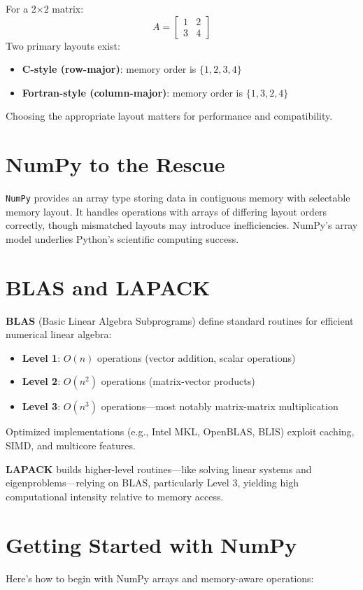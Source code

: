 \documentclass{book}
\begin{document}
For a 2×2 matrix:
\[
A = \begin{bmatrix}
1 & 2\\
3 & 4
\end{bmatrix}
\]
Two primary layouts exist:
\begin{itemize}
  \item \textbf{C-style (row-major)}: memory order is \(\{1,2,3,4\}\)
  \item \textbf{Fortran-style (column-major)}: memory order is \(\{1,3,2,4\}\)
\end{itemize}
Choosing the appropriate layout matters for performance and compatibility.

\section{NumPy to the Rescue}
\texttt{NumPy} provides an array type storing data in contiguous memory with selectable memory layout. It handles operations with arrays of differing layout orders correctly, though mismatched layouts may introduce inefficiencies. NumPy’s array model underlies Python's scientific computing success.

\section{BLAS and LAPACK}
\textbf{BLAS} (Basic Linear Algebra Subprograms) define standard routines for efficient numerical linear algebra:
\begin{itemize}
  \item \textbf{Level 1}: \(O(n)\) operations (vector addition, scalar operations)
  \item \textbf{Level 2}: \(O(n^2)\) operations (matrix-vector products)
  \item \textbf{Level 3}: \(O(n^3)\) operations—most notably matrix-matrix multiplication
\end{itemize}
Optimized implementations (e.g., Intel MKL, OpenBLAS, BLIS) exploit caching, SIMD, and multicore features.

\textbf{LAPACK} builds higher-level routines—like solving linear systems and eigenproblems—relying on BLAS, particularly Level 3, yielding high computational intensity relative to memory access.

\section{Getting Started with NumPy}
Here's how to begin with NumPy arrays and memory-aware operations:
\end{document}
